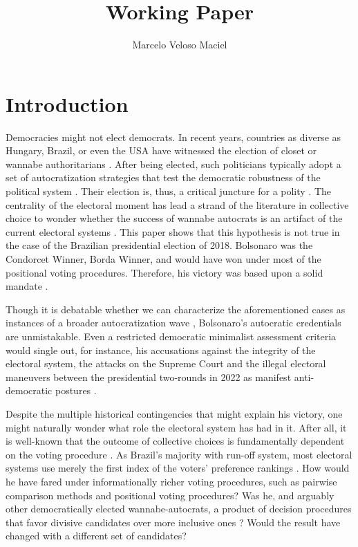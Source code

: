 \documentclass[hidelinks,11pt]{article}
\author{Marcelo Veloso Maciel}
\date{}
\title{Working Paper}
\begin{document}
\maketitle



\section{Introduction}\label{sec1}

Democracies might not elect democrats. In recent years, countries as diverse
as Hungary, Brazil, or even the USA have witnessed the election of closet or
wannabe authoritarians \parencite{luhrmann2018democracy, chiopris2021wolf}.
After being elected, such politicians typically adopt a set of
autocratization strategies that test the democratic robustness of the political
system \parencite{sorensen2021towards, bermeo2016democratic}. Their election is,
thus, a critical juncture for a polity \parencite{thelen2009institutional}. The
centrality of the electoral moment has lead a strand of the literature in
collective choice to wonder whether the success of wannabe autocrats is an
artifact of the current electoral systems \parencite{potthoff2021condorcet,
  kurrild2018trump, woon2020trump}. This paper shows that this hypothesis is not true in the case of the
Brazilian presidential election of 2018. Bolsonaro
was the Condorcet Winner, Borda Winner, and would have won under most of
the positional voting procedures. Therefore, his victory was based upon a solid
mandate \parencite{tabarrok2001president}.

Though it is debatable whether we can characterize the aforementioned
cases as instances of a broader autocratization wave
\parencite{cassani2020reversing, waldner2018unwelcome}, Bolsonaro's autocratic
credentials are unmistakable. Even a restricted democratic minimalist assessment
criteria would single out, for instance, his accusations against the integrity
of the electoral system, the attacks on the Supreme Court and the illegal
electoral maneuvers between the presidential two-rounds in 2022 as manifest
anti-democratic postures \parencite{przeworski1999minimalist,
  schmitter1994dangers}.

Despite the multiple historical contingencies that might explain his victory,
one might naturally wonder what role the electoral system has had in it. After
all, it is well-known that the outcome of collective choices is fundamentally
dependent on the voting procedure \parencite{riker1982liberalism}.
As Brazil's majority with run-off system, most electoral systems use merely the
first index of the voters' preference rankings
\parencite{grofman04_if_you_like_alter_vote} . How would he have fared
under informationally richer voting procedures, such as pairwise comparison
methods and positional voting procedures? Was he, and arguably other
democratically elected wannabe-autocrats, a product of decision procedures that
favor divisive candidates over more inclusive ones
\parencite{igersheim22_compar_votin_method}? Would the result have changed with a different set of candidates?
\end{document}
